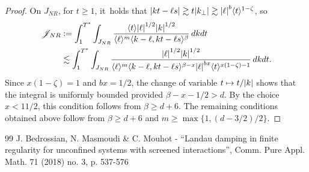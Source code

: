 \documentclass[10pt,a4paper]{article}
\theoremstyle{plain}
\theoremstyle{remark}
\newcommand{\ak}{\abs{k}}
\newcommand{\jb}[1]{\langle#1\rangle}
\begin{document}
\begin{proof}
On $J_{NR}$, for $t\geq1$, it~holds that $\abs{kt-\ell s}\gtrsim t\abs{k_\perp}\gtrsim\abs{\ell}^b\jb{t}^{1-\zeta}$, so
\begin{align*}
\mathscr J_{NR}&:=\int_1^{T^*}\int_{J_{NR}}\frac{\jb{t}\abs{\ell}^{1/2}\ak^{1/2}}{\jb{\ell}^m\jb{k-\ell,kt-\ell s}^{\beta}}\,dkdt\\
&\lesssim\int_1^{T^*}\int_{J_{NR}}\frac{\abs{\ell}^{1/2}\ak^{1/2}}{\jb{\ell}^m\jb{k-\ell,kt-\ell s}^{\beta-x}\abs{\ell}^{bx}\jb{t}^{x(1-\zeta)-1}}\,dkdt.
\end{align*}Since $x(1-\zeta)=1$ and $bx=1/2$, the change of variable $t\mapsto t/\ak$ shows that the integral is uniformly bounded provided $\beta-x-1/2>d$. By the choice $x<11/2$, this condition follows from $\beta\geq d+6$. The remaining conditions obtained above follow from $\beta\geq d+6$ and $m\geq\max\{1,(d-3/2)/2\}$.
\end{proof}

\begin{thebibliography}{99}
 J. Bedrossian, N. Masmoudi \& C. Mouhot - “Landau damping in finite regularity for unconfined systems with screened interactions”, Comm. Pure Appl. Math. 71 (2018) no. 3, p. 537-576
\end{thebibliography}
\end{document}
